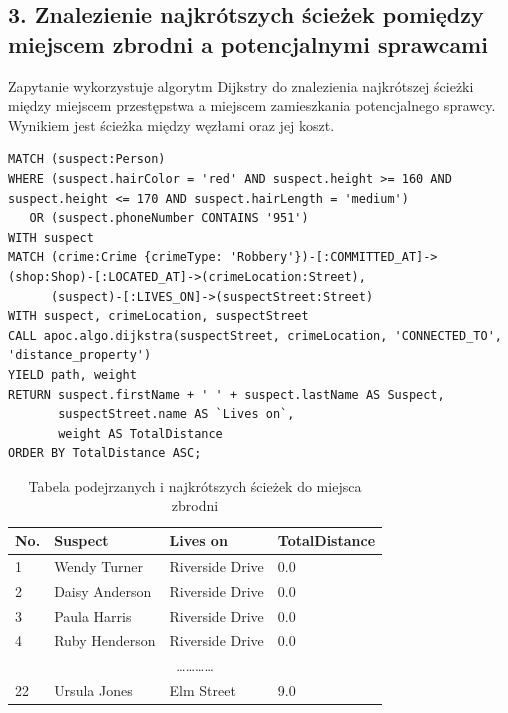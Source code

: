 \documentclass[a4paper,12pt]{article}
\begin{document}
\subsection*{3. Znalezienie najkrótszych ścieżek pomiędzy miejscem zbrodni a potencjalnymi sprawcami}
Zapytanie wykorzystuje algorytm Dijkstry do znalezienia najkrótszej ścieżki między miejscem przestępstwa a miejscem zamieszkania potencjalnego sprawcy. Wynikiem jest ścieżka między węzłami oraz jej koszt.
\begin{verbatim}
MATCH (suspect:Person)
WHERE (suspect.hairColor = 'red' AND suspect.height >= 160 AND suspect.height <= 170 AND suspect.hairLength = 'medium')
   OR (suspect.phoneNumber CONTAINS '951')
WITH suspect
MATCH (crime:Crime {crimeType: 'Robbery'})-[:COMMITTED_AT]->(shop:Shop)-[:LOCATED_AT]->(crimeLocation:Street),
      (suspect)-[:LIVES_ON]->(suspectStreet:Street)
WITH suspect, crimeLocation, suspectStreet
CALL apoc.algo.dijkstra(suspectStreet, crimeLocation, 'CONNECTED_TO', 'distance_property') 
YIELD path, weight
RETURN suspect.firstName + ' ' + suspect.lastName AS Suspect,
       suspectStreet.name AS `Lives on`,
       weight AS TotalDistance
ORDER BY TotalDistance ASC;
\end{verbatim}

\begin{table}[h!]
\centering
\begin{tabular}{|l|l|l|l|}
\hline
\textbf{No.} & \textbf{Suspect}       & \textbf{Lives on}       & \textbf{TotalDistance} \\ \hline
1           & Wendy Turner           & Riverside Drive          & 0.0                   \\ \hline
2           & Daisy Anderson         & Riverside Drive          & 0.0                   \\ \hline
3           & Paula Harris           & Riverside Drive          & 0.0                   \\ \hline
4           & Ruby Henderson         & Riverside Drive          & 0.0                   \\ \hline
\multicolumn{4}{|c|}{\dots\dots\dots\dots} \\ \hline
22          & Ursula Jones           & Elm Street               & 9.0                   \\ \hline
\end{tabular}
\caption{Tabela podejrzanych i najkrótszych ścieżek do miejsca zbrodni}
\end{table}
\end{document}

